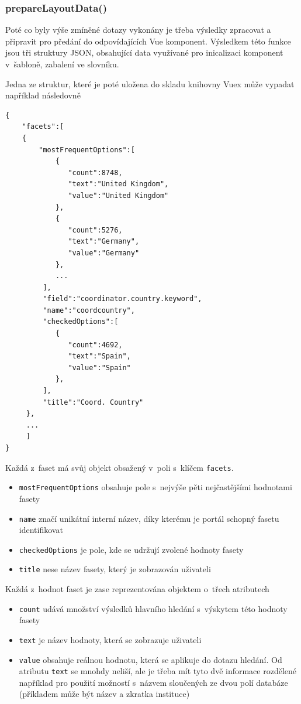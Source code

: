 \subsubsection*{prepareLayoutData()}
Poté co byly výše zmíněné dotazy vykonány je třeba výsledky zpracovat a připravit pro předání do odpovídajících Vue komponent. Výsledkem této funkce jsou tři struktury JSON, obsahující data využívané pro inicalizaci komponent v~šabloně, zabalení ve slovníku.

Jedna ze struktur, které je poté uložena do skladu knihovny Vuex může vypadat například následovně

\begin{verbatim}
{
    "facets":[
    {
        "mostFrequentOptions":[  
            {  
               "count":8748,
               "text":"United Kingdom",
               "value":"United Kingdom"
            },
            {  
               "count":5276,
               "text":"Germany",
               "value":"Germany"
            },
            ...
         ],
         "field":"coordinator.country.keyword",
         "name":"coordcountry",
         "checkedOptions":[  
            {  
               "count":4692,
               "text":"Spain",
               "value":"Spain"
            },
         ],
         "title":"Coord. Country"
     },
     ...
     ]
}
\end{verbatim}
Každá z~faset má svůj objekt obsažený v~poli s~klíčem \texttt{facets}.
\begin{itemize}
\item \texttt{mostFrequentOptions} obsahuje pole s~nejvýše pěti nejčastějšími hodnotami fasety
\item \texttt{name} značí unikátní interní název, díky kterému je portál schopný fasetu identifikovat
\item \texttt{checkedOptions} je pole, kde se udržují zvolené hodnoty fasety
\item \texttt{title} nese název fasety, který je zobrazován uživateli
\end{itemize}
Každá z~hodnot faset je zase reprezentována objektem o~třech atributech
\begin{itemize}
\item \texttt{count} udává množství výsledků hlavního hledání s~výskytem této hodnoty fasety
\item \texttt{text} je název hodnoty, která se zobrazuje uživateli
\item \texttt{value} obsahuje reálnou hodnotu, která se aplikuje do dotazu hledání. Od atributu \texttt{text} se mnohdy neliší, ale je třeba mít tyto dvě informace rozdělené například pro použití možností s~názvem sloučených ze dvou polí databáze (příkladem může být název a zkratka instituce)
\end{itemize}

